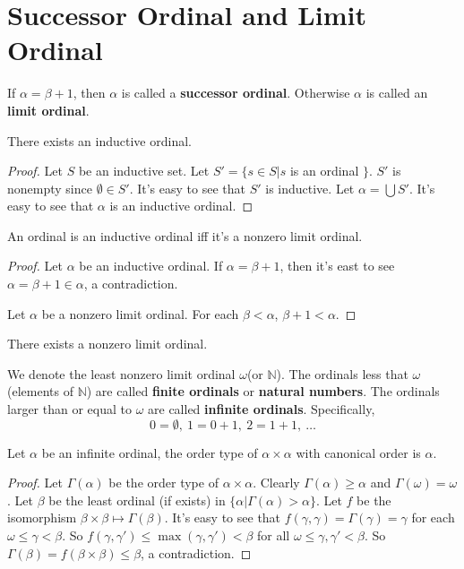 \documentclass[12pt]{book}
\begin{document}
\section{Successor Ordinal and Limit Ordinal}
\begin{definition}
	If $\alpha=\beta+1$, then $\alpha$ is called a {\bf successor ordinal}. Otherwise $\alpha$ is called an {\bf limit ordinal}.
\end{definition}

\begin{lemma}
	There exists an inductive ordinal.
\end{lemma}
\begin{proof}
	Let $S$ be an inductive set. Let $S'=\{s\in S| s$ is an ordinal $\}$. $S'$ is nonempty since $\emptyset\in S'$. It's easy to see that $S'$ is inductive. Let $\alpha=\bigcup S'$. It's easy to see that $\alpha$ is an inductive ordinal.
\end{proof}

\begin{lemma}
	An ordinal is an inductive ordinal iff it's a nonzero limit ordinal.
\end{lemma}
\begin{proof}
	Let $\alpha$ be an inductive ordinal. If $\alpha=\beta+1$, then it's east to see $\alpha=\beta+1\in \alpha$, a contradiction.
	
	Let $\alpha$ be a nonzero limit ordinal. For each $\beta<\alpha$, $\beta+1<\alpha$.
\end{proof}

\begin{corollary}
	There exists a nonzero limit ordinal.
\end{corollary}

\begin{definition}
	We denote the least nonzero limit ordinal $\omega$(or $\mathbb N$). The ordinals less that $\omega$ (elements of $\mathbb N$) are called {\bf finite ordinals} or {\bf natural numbers}. The ordinals larger than or equal to $\omega$ are called {\bf infinite ordinals}. Specifically,
	\begin{equation}
		0=\emptyset,\ 1=0+1,\ 2=1+1,\ \dots
	\end{equation}
\end{definition}

\begin{lemma}
	Let $\alpha$ be an infinite ordinal, the order type of $\alpha\times\alpha$ with canonical order is $\alpha$.
	\label{lem:canorder}
\end{lemma}
\begin{proof}
	Let $\Gamma(\alpha)$ be the order type of $\alpha\times\alpha$. Clearly $\Gamma(\alpha)\geq\alpha$ and $\Gamma(\omega)=\omega$. Let $\beta$ be the least ordinal (if exists) in $\{\alpha|\Gamma(\alpha)>\alpha\}$. Let $f$ be the isomorphism $\beta\times\beta\mapsto \Gamma(\beta)$. It's easy to see that $f(\gamma,\gamma)=\Gamma(\gamma)=\gamma$ for each $\omega\leq\gamma<\beta$. So $f(\gamma,\gamma')\leq\max(\gamma,\gamma')<\beta$ for all $\omega\leq\gamma,\gamma'<\beta$. So $\Gamma(\beta)=f(\beta\times\beta)\leq \beta$, a contradiction.
\end{proof}
\end{document}
